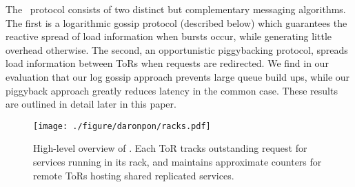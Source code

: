 The \systemname\ protocol consists of two distinct but complementary messaging
algorithms.  The first is a logarithmic gossip protocol (described below) which
guarantees the reactive spread of load information when bursts occur, while
generating little overhead otherwise.  The second, an opportunistic
piggybacking protocol, spreads load information between ToRs when requests are
redirected. We find in our evaluation that our log gossip approach prevents
large queue build ups, while our piggyback approach greatly reduces latency in
the common case.  These results are outlined in detail later in this paper.

\begin{figure}[ht]
  \centering
    \texttt{[image: ./figure/daronpon/racks.pdf]}
    \caption{High-level overview of \toolname. Each ToR tracks
    outstanding request for services running in its rack, and
    maintains approximate counters for remote ToRs hosting shared
    replicated services.} 

  \label{fig:racks}
\end{figure}




